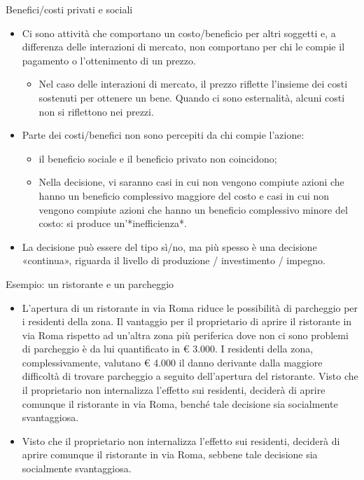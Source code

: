\documentclass[aspectratio=64,11pt]{beamer}
\begin{document}
\begin{frame}{Benefici/costi privati e sociali}
\begin{itemize}
\item Ci sono attività che comportano un costo/beneficio per altri soggetti e, a
differenza delle interazioni di mercato, non comportano per chi le compie il
pagamento o l’ottenimento di un prezzo.
\begin{itemize}
\item Nel caso delle interazioni di mercato, il prezzo riflette l’insieme dei
costi sostenuti per ottenere un bene. Quando ci sono esternalità, alcuni
costi non si riflettono nei prezzi.
\end{itemize}
\item Parte dei costi/benefici non sono percepiti da chi compie l’azione:
\begin{itemize}
\item il \alert{beneficio sociale} e il \alert{beneficio privato} non coincidono;
\item Nella decisione, vi saranno casi in cui non vengono compiute azioni che
hanno un beneficio complessivo maggiore del costo e casi in cui non
vengono compiute azioni che hanno un beneficio complessivo minore del
costo: si produce un’*inefficienza*.
\end{itemize}
\item La decisione può essere del tipo sì/no, ma più spesso è una decisione
«continua», riguarda il \alert{livello} di produzione / investimento / impegno.
\end{itemize}
\end{frame}


\begin{frame}{Esempio: un ristorante e un parcheggio}
\begin{itemize}
\item L’apertura di un ristorante in via Roma riduce le possibilità di parcheggio
per i residenti della zona. Il vantaggio per il proprietario di aprire il
ristorante in via Roma rispetto ad un’altra zona più periferica dove non ci
sono problemi di parcheggio è da lui quantificato in € 3.000. I residenti
della zona, complessivamente, valutano € 4.000 il danno derivante dalla
maggiore difficoltà di trovare parcheggio a seguito dell’apertura del
ristorante.  Visto che il proprietario non internalizza l’effetto sui
residenti, deciderà di aprire comunque il ristorante in via Roma, benché
tale decisione sia socialmente svantaggiosa.
\item Visto che il proprietario non internalizza l’effetto sui residenti, deciderà
di aprire comunque il ristorante in via Roma, sebbene tale decisione sia
socialmente svantaggiosa.
\end{itemize}
\end{frame}
\end{document}
